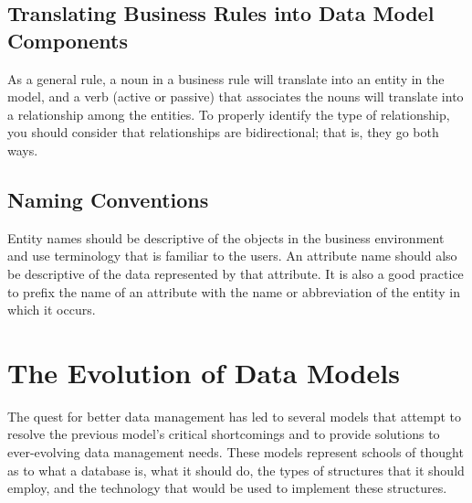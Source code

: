 \documentclass[a4paper, 12pt, titlepage]{report}
\begin{document}
\subsection{Translating Business Rules into Data Model Components}
As a general rule, a noun in a business rule will translate into an entity in the model, and a verb (active or passive) that associates the nouns will translate into a relationship among the entities. To properly identify the type of relationship, you should consider that relationships are bidirectional; that is, they go both ways.

\subsection{Naming Conventions}
Entity names should be descriptive of the objects in the business environment and use terminology that is familiar to the users. An attribute name should also be descriptive of the data represented by that attribute. It is also a good practice to prefix the name of an attribute with the name or abbreviation of the entity in which it occurs.

\section{The Evolution of Data Models}
The quest for better data management has led to several models that attempt to resolve the previous model’s critical shortcomings and to provide solutions to ever-evolving data management needs. These models represent schools of thought as to what a database is, what it should do, the types of structures that it should employ, and the technology that would be used to implement these structures.
\end{document}
